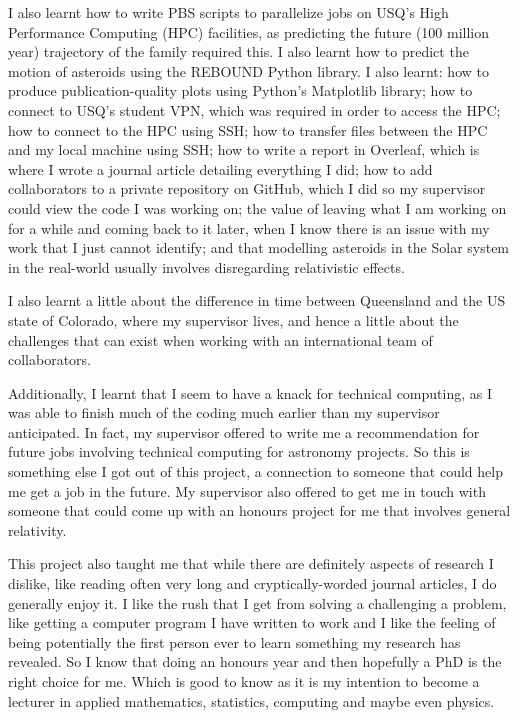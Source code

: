 \documentclass[12pt,a4paper]{article}
\begin{document}
I also learnt how to write PBS scripts to parallelize jobs on USQ's High Performance Computing (HPC) facilities, as predicting the future (100 million year) trajectory of the family required this. I also learnt how to predict the motion of asteroids using the REBOUND Python library. I also learnt: how to produce publication-quality plots using Python's Matplotlib library; how to connect to USQ's student VPN, which was required in order to access the HPC; how to connect to the HPC using SSH; how to transfer files between the HPC and my local machine using SSH; how to write a report in Overleaf, which is where I wrote a journal article detailing everything I did; how to add collaborators to a private repository on GitHub, which I did so my supervisor could view the code I was working on; the value of leaving what I am working on for a while and coming back to it later, when I know there is an issue with my work that I just cannot identify; and that modelling asteroids in the Solar system in the real-world usually involves disregarding relativistic effects.

I also learnt a little about the difference in time between Queensland and the US state of Colorado, where my supervisor lives, and hence a little about the challenges that can exist when working with an international team of collaborators.

Additionally, I learnt that I seem to have a knack for technical computing, as I was able to finish much of the coding much earlier than my supervisor anticipated. In fact, my supervisor offered to write me a recommendation for future jobs involving technical computing for astronomy projects. So this is something else I got out of this project, a connection to someone that could help me get a job in the future. My supervisor also offered to get me in touch with someone that could come up with an honours project for me that involves general relativity. 

This project also taught me that while there are definitely aspects of research I dislike, like reading often very long and cryptically-worded journal articles, I do generally enjoy it. I like the rush that I get from solving a challenging a problem, like getting a computer program I have written to work and I like the feeling of being potentially the first person ever to learn something my research has revealed. So I know that doing an honours year and then hopefully a PhD is the right choice for me. Which is good to know as it is my intention to become a lecturer in applied mathematics, statistics, computing and maybe even physics. 
\end{document}
